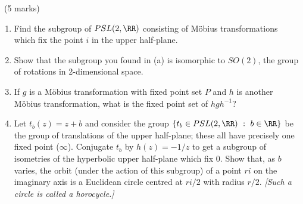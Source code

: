 \documentclass[12pt]{article}
\begin{document}
\begin{question}\ (5 marks)\\

  \begin{enumerate}
  \item[(a)] Find the subgroup of $PSL(2,\RR)$ consisting of M\"obius transformations which fix the point $i$ in the upper half-plane.
  \item[(b)] Show that the subgroup you found in (a) is isomorphic to $SO(2)$, the group of rotations in 2-dimensional space.
  \item[(c)] If $g$ is a M\"obius transformation with fixed point set $P$ and $h$ is another M\"obius transformation, what is the fixed point set of $hgh^{-1}$?
  \item[(d)] Let $t_b(z)=z+b$ and consider the group $\{t_b\in PSL(2,\RR)\ :\ b\in\RR\}$ be the group of translations of the upper half-plane; these all have precisely one fixed point ($\infty$). Conjugate $t_b$ by $h(z)=-1/z$ to get a subgroup of isometries of the hyperbolic upper half-plane which fix $0$. Show that, as $b$ varies, the orbit (under the action of this subgroup) of a point $ri$ on the imaginary axis is a Euclidean circle centred at $ri/2$ with radius $r/2$. {\em [Such a circle is called a horocycle.]}
  \end{enumerate}
\end{question}
\end{document}
